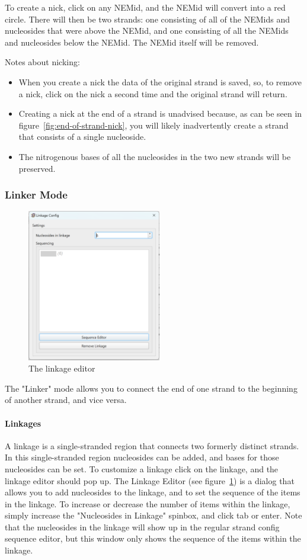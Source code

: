 \documentclass[titlepage]{article}
\begin{document}
To create a nick, click on any NEMid, and the NEMid will convert into a red circle. There will then be two strands: one consisting of all of the NEMids and nucleosides that were above the NEMid, and one consisting of all the NEMids and nucleosides below the NEMid. The NEMid itself will be removed.

Notes about nicking:
\begin{itemize}
	\item When you create a nick the data of the original strand is saved, so, to remove a nick, click on the nick a second time and the original strand will return.
	\item Creating a nick at the end of a strand is unadvised because, as can be seen in figure~\ref{fig:end-of-strand-nick}, you will likely inadvertently create a strand that consists of a single nucleoside.
	\item The nitrogenous bases of all the nucleosides in the two new strands will be preserved.
\end{itemize}

\subsubsection{Linker Mode}

\begin{figure}[h] \label{fig:linkage-editor}
	\centering
	\caption{The linkage editor}
	\includegraphics[width=2.3in]{linkage-editor.png}
\end{figure}

The "Linker" mode allows you to connect the end of one strand to the beginning of another strand, and vice versa. 

\paragraph{Linkages}
A linkage is a single-stranded region that connects two formerly distinct strands. In this single-stranded region nucleosides can be added, and bases for those nucleosides can be set. To customize a linkage click on the linkage, and the linkage editor should pop up. The Linkage Editor (see figure~\ref{fig:linkage-editor}) is a dialog that allows you to add nucleosides to the linkage, and to set the sequence of the items in the linkage. To increase or decrease the number of items within the linkage, simply increase the "Nucleosides in Linkage" spinbox, and click tab or enter. Note that the nucleosides in the linkage will show up in the regular strand config sequence editor, but this window only shows the sequence of the items within the linkage.
\end{document}
